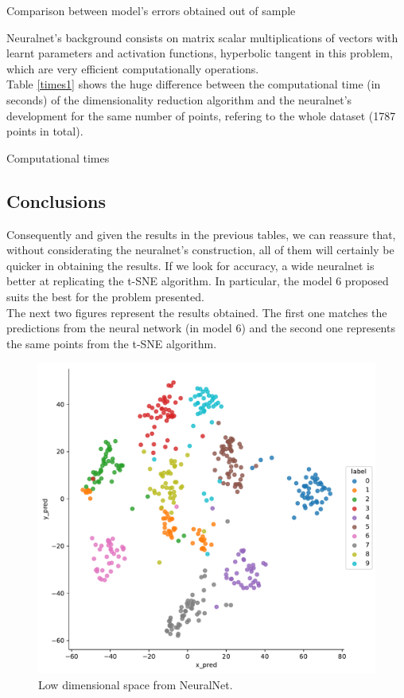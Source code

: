 \documentclass[a4paper,11pt,spanish]{report}
\begin{document}
\begin{table}[h]
\vspace{20px}
\centering

\caption{\label{metrics1}Comparison between model's errors obtained out of sample}
\end{table}

Neuralnet's background consists on matrix scalar multiplications of vectors with learnt parameters and activation functions, hyperbolic tangent in this problem, which are very efficient computationally operations.\\
Table \ref{times1} shows the huge difference between the computational time (in seconds) of the dimensionality reduction algorithm and the neuralnet's development for the same number of points, refering to the whole dataset (1787 points in total).

\begin{table}[h]
\vspace{10px}
\centering

\caption{\label{times1}Computational times}
\end{table}

\subsection{Conclusions}
\label{ssec:conc1}

Consequently and given the results in the previous tables, we can reassure that, without considerating the neuralnet's construction, all of them will certainly be quicker in obtaining the results. If we look for accuracy, a wide neuralnet is better at replicating the t-SNE algorithm. In particular, the model 6 proposed suits the best for the problem presented.\\
The next two figures represent the results obtained. The first one matches the predictions from the neural network (in model 6) and the second one represents the same points from the t-SNE algorithm.

\begin{figure}
\centering
\includegraphics[width=12cm]{figures/app1plotpredictions.pdf}
\caption{\label{figureNN}Low dimensional space from NeuralNet.}
\end{figure}
\end{document}
